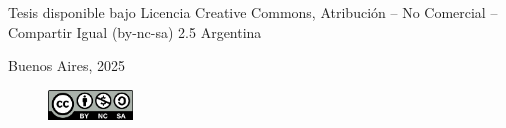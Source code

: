 \newpage
\pagestyle{empty}
Tesis disponible bajo Licencia Creative Commons, Atribución – No Comercial – Compartir Igual (by-nc-sa) 2.5 Argentina

Buenos Aires, 2025
\begin{figure}
    \centering
    \includegraphics[width=0.2\textwidth]{licencia.png}
\end{figure}